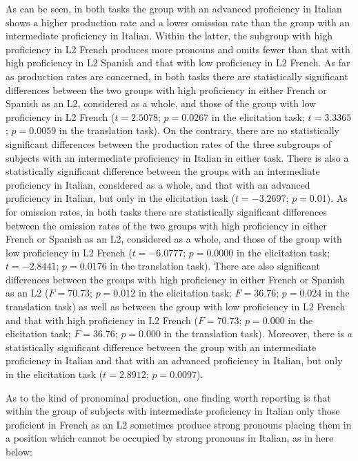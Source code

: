 \documentclass[output=paper,modfonts,nonflat,newtxmath]{langsci/langscibook}
\begin{document}
As can be seen, in both tasks the group with an advanced proficiency in Italian shows a higher production rate and a lower omission rate than the group with an intermediate proficiency in Italian. Within the latter, the subgroup with high proficiency in L2 French produces more pronouns and omits fewer than that with high proficiency in L2 Spanish and that with low proficiency in L2 French. As far as production rates are concerned, in both tasks there are statistically significant differences between the two groups with high proficiency in either French or Spanish as an L2, considered as a whole, and those of the group with low proficiency in L2 French ($t = 2.5078$; $p = 0.0267$ in the elicitation task; $t = 3.3365$; $p = 0.0059$ in the translation task). On the contrary, there are no statistically significant differences between the production rates of the three subgroups of subjects with an intermediate proficiency in Italian in either task. There is also a statistically significant difference between the groups with an intermediate proficiency in Italian, considered as a whole, and that with an advanced proficiency in Italian, but only in the elicitation task ($t = -3.2697$; $p = 0.01$). As for omission rates, in both tasks there are statistically significant differences between the omission rates of the two groups with high proficiency in either French or Spanish as an L2, considered as a whole, and those of the group with low proficiency in L2 French ($t = -6.0777$; $p = 0.0000$ in the elicitation task; $t = -2.8441$; $p = 0.0176$ in the translation task). There are also significant differences between the groups with high proficiency in either French or Spanish as an L2 ($F = 70.73$; $p = 0.012$ in the elicitation task; $F = 36.76$; $p = 0.024$ in the translation task) as well as between the group with low proficiency in L2 French and that with high proficiency in L2 French ($F = 70.73$; $p = 0.000$ in the elicitation task; $F = 36.76$; $p = 0.000$ in the translation task). Moreover, there is a statistically significant difference between the group with an intermediate proficiency in Italian and that with an advanced proficiency in Italian, but only in the elicitation task ($t = 2.8912$; $p = 0.0097$).


As to the kind of pronominal production, one finding worth reporting is that within the group of subjects with intermediate proficiency in Italian only those proficient in French as an L2 sometimes produce strong pronouns placing them in a position which cannot be occupied by strong pronouns in Italian, as in  here below:
\end{document}
